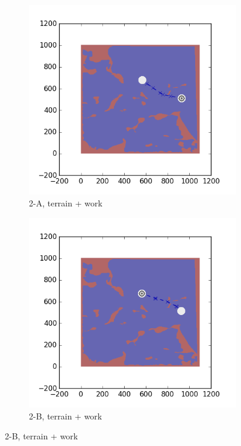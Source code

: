 \documentclass{tamuccthesis}
\begin{document}
\begin{figure}[H]
    \begin{subfigure}[b]{0.35\textwidth}
        \centering
        \includegraphics[width=\textwidth,trim={4cm 3cm 2cm 3cm},clip]{EXP3RG_PathBa_-1_-1_-1_0.png}
        \caption{\small{2-A, terrain + work}}
        \label{fig:Path_2-A_terrain_work}
    \end{subfigure}
    \hfill
    \begin{subfigure}[b]{0.35\textwidth}  
        \centering 
        \includegraphics[width=\textwidth,trim={4cm 3cm 2cm 3cm},clip]{EXP3RG_PathBb_-1_-1_-1_0.png}
        \caption{\small{2-B, terrain + work}}
        \label{fig:Path_2-B_terrain_work}
    \end{subfigure}


\end{figure}
\end{document}
